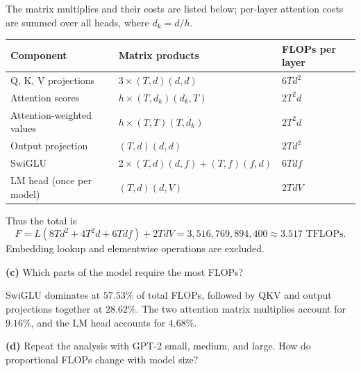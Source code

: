 The matrix multiplies and their costs are listed below;
per-layer attention costs are summed over all heads, where $d_k=d/h$.
\begin{center}
\small
\begin{tabular}{lll}
\toprule
Component & Matrix products & FLOPs per layer \\
\midrule
Q, K, V projections & $3\times(T,d)(d,d)$ & $6Td^2$ \\
Attention scores & $h\times(T,d_k)(d_k,T)$ & $2T^2d$ \\
Attention-weighted values & $h\times(T,T)(T,d_k)$ & $2T^2d$ \\
Output projection & $(T,d)(d,d)$ & $2Td^2$ \\
SwiGLU & $2\times(T,d)(d,f)+(T,f)(f,d)$ & $6Tdf$ \\
\midrule
LM head (once per model) & $(T,d)(d,V)$ & $2TdV$ \\
\bottomrule
\end{tabular}
\end{center}
Thus the total is
\[
F=L(8Td^2+4T^2d+6Tdf)+2TdV
=3{,}516{,}769{,}894{,}400\approx3.517\text{ TFLOPs}.
\]
Embedding lookup and elementwise operations are excluded.

\textbf{(c)} Which parts of the model require the most FLOPs?


SwiGLU dominates at $57.53\%$ of total FLOPs, followed by
QKV and output projections together at $28.62\%$. The two attention
matrix multiplies account for $9.16\%$, and the LM head accounts for $4.68\%$.

\textbf{(d)} Repeat the analysis with GPT-2 small, medium, and large. How do proportional FLOPs change with model size?


